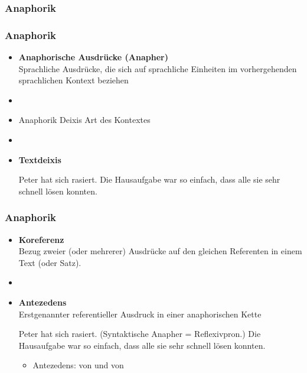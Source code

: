 %
\subsubsection{Anaphorik}
%

\begin{frame}
\frametitle{Anaphorik}

\begin{itemize}
	\item \textbf{Anaphorische Ausdrücke (Anapher)}\\
Sprachliche Ausdrücke, die sich auf sprachliche Einheiten im vorhergehenden sprachlichen Kontext beziehen
	\item[]
	\item Anaphorik \vs Deixis \ras Art des Kontextes
	\item[]	
	\item \textbf{Textdeixis}
	
	\eal 
	\ex Peter hat sich rasiert.
	\ex Die Hausaufgabe war so einfach, dass alle sie sehr schnell lösen konnten.
	\zl
	
\end{itemize}
	
\end{frame}



\begin{frame}
\frametitle{Anaphorik}

\begin{itemize}
	\item \textbf{Koreferenz}\\
Bezug zweier (oder mehrerer) Ausdrücke auf den gleichen Referenten in einem Text (oder Satz).
	\item[]
	\item \textbf{Antezedens} \\
Erstgenannter referentieller Ausdruck in einer anaphorischen Kette
		
		\eal 
		\ex Peter hat sich rasiert. (Syntaktische Anapher = Reflexivpron.)
		\ex Die Hausaufgabe war so einfach, dass alle sie sehr schnell lösen konnten.
		\zl
		
		\begin{itemize}
			\item Antezedens:  von  und  von 
		\end{itemize}
	
\end{itemize}

\end{frame}


